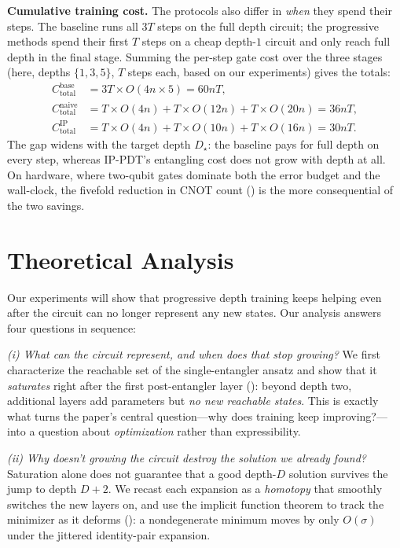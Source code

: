 \documentclass[11pt]{article}
\theoremstyle{plain}
\theoremstyle{plain}
\begin{document}
\medskip\noindent\textbf{Cumulative training cost.}
The protocols also differ in \emph{when} they spend their steps.  The
baseline runs all $3T$ steps on the full depth circuit; the
progressive methods spend their first $T$ steps on a cheap depth-$1$
circuit and only reach full depth in the final stage.  Summing the
per-step gate cost over the three stages (here, depths $\{1,3,5\}$, $T$ steps
each, based on our experiments) gives the totals:
\begin{align}
  C_{\mathrm{total}}^{\mathrm{base}}
  &=3T\times O(4n\times 5)=60  nT, \label{eq:cost_base}\\
  C_{\mathrm{total}}^{\mathrm{naive}}
  &=T\times O(4n)+T\times O(12n)+T\times O(20n)=36  nT, \label{eq:cost_naive}\\
  C_{\mathrm{total}}^{\mathrm{IP}}
  &=T\times O(4n)+T\times O(10n)+T\times O(16n)=30  nT. \label{eq:cost_ip}
\end{align}
The gap widens with the
target depth $D_\star$: the baseline pays for full depth on every step,
whereas IP-PDT's entangling cost does not grow with depth at all.  On
hardware, where two-qubit gates dominate both the error budget and the
wall-clock, the fivefold reduction in CNOT count ()
is the more consequential of the two savings.
\section{Theoretical Analysis}\label{sec:theory}
Our experiments will show that progressive depth training keeps helping
even after the circuit can no longer represent any new states.  Our analysis answers four questions in sequence:

\emph{(i) What can the circuit represent, and when does that stop
growing?}  We first characterize the reachable set of the
single-entangler ansatz and show that it \emph{saturates} right after
the first post-entangler layer (): beyond depth
two, additional layers add parameters but \emph{no new reachable
states}.  This is exactly what turns the paper's central question---why
does training keep improving?---into a question about \emph{optimization}
rather than expressibility.

\emph{(ii) Why doesn't growing the circuit destroy the solution we
already found?}  Saturation alone does not guarantee that a good
depth-$D$ solution survives the jump to depth $D{+}2$.  We recast each
expansion as a \emph{homotopy} that smoothly switches the new layers on,
and use the implicit function theorem to track the minimizer as it
deforms (): a nondegenerate minimum moves by only
$O(\sigma)$ under the jittered identity-pair expansion.
\end{document}
